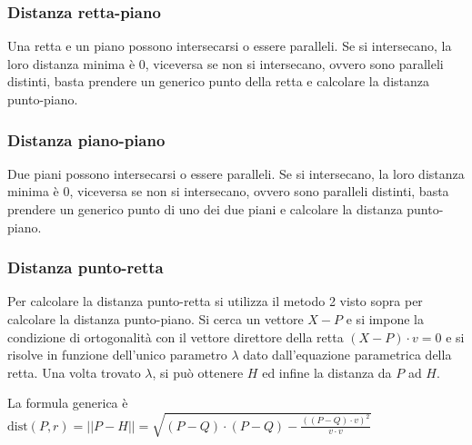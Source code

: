\documentclass[a4paper]{article}
\newcommand\dist{\text{dist}}	%
\begin{document}
\subsubsection*{Distanza retta-piano}
Una retta e un piano possono intersecarsi o essere paralleli. Se si intersecano, la loro distanza minima è 0, viceversa se non si
intersecano, ovvero sono paralleli distinti, basta prendere un generico punto della retta e calcolare la distanza punto-piano.

\subsubsection*{Distanza piano-piano}
Due piani possono intersecarsi o essere paralleli. Se si intersecano, la loro distanza minima è 0, viceversa se non si intersecano,
ovvero sono paralleli distinti, basta prendere un generico punto di uno dei due piani e calcolare la distanza punto-piano.

\subsubsection*{Distanza punto-retta}
Per calcolare la distanza punto-retta si utilizza il metodo 2 visto sopra per calcolare la distanza punto-piano. Si cerca un vettore
\(X-P\) e si impone la condizione di ortogonalità con il vettore direttore della retta \((X-P) \cdot v = 0\) e si risolve in funzione
dell'unico parametro \(\lambda\) dato dall'equazione parametrica della retta. Una volta trovato \(\lambda\), si può ottenere \(H\)
ed infine la distanza da \(P\) ad \(H\).

La formula generica è \(\dist (P,r) = || P - H || = \sqrt{(P-Q) \cdot (P-Q) - \frac{((P-Q) \cdot v)^2}{v \cdot v}}\)

\newpage
\end{document}
